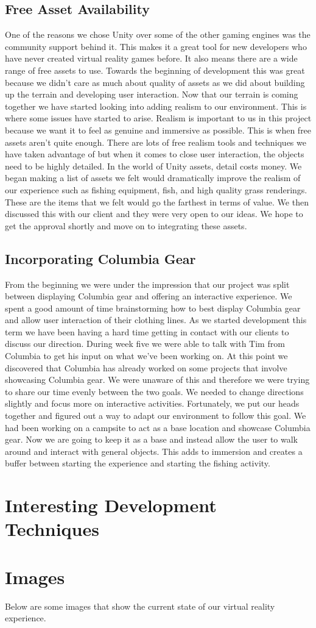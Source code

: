 \documentclass[10pt,journal,compsoc,onecolumn, draftclsnofoot]{IEEEtran}
\begin{document}
\subsection{Free Asset Availability}
One of the reasons we chose Unity over some of the other gaming engines was the community support behind it.
This makes it a great tool for new developers who have never created virtual reality games before.
It also means there are a wide range of free assets to use.
Towards the beginning of development this was great because we didn’t care as much about quality of assets as we did about building up the terrain and developing user interaction.
Now that our terrain is coming together we have started looking into adding realism to our environment.
This is where some issues have started to arise.
Realism is important to us in this project because we want it to feel as genuine and immersive as possible.
This is when free assets aren’t quite enough.
There are lots of free realism tools and techniques we have taken advantage of but when it comes to close user interaction, the objects need to be highly detailed.
In the world of Unity assets, detail costs money. We began making a list of assets we felt would dramatically improve the realism of our experience such as fishing equipment, fish, and high quality grass renderings.
These are the items that we felt would go the farthest in terms of value.
We then discussed this with our client and they were very open to our ideas.
We hope to get the approval shortly and move on to integrating these assets.

\subsection{Incorporating Columbia Gear}
From the beginning we were under the impression that our project was split between displaying Columbia gear and offering an interactive experience.
We spent a good amount of time brainstorming how to best display Columbia gear and allow user interaction of their clothing lines.
As we started development this term we have been having a hard time getting in contact with our clients to discuss our direction.
During week five we were able to talk with Tim from Columbia to get his input on what we've been working on.
At this point we discovered that Columbia has already worked on some projects that involve showcasing Columbia gear.
We were unaware of this and therefore we were trying to share our time evenly between the two goals.
We needed to change directions slightly and focus more on interactive activities.
Fortunately, we put our heads together and figured out a way to adapt our environment to follow this goal.
We had been working on a campsite to act as a base location and showcase Columbia gear.
Now we are going to keep it as a base and instead allow the user to walk around and interact with general objects.
This adds to immersion and creates a buffer between starting the experience and starting the fishing activity.


\section{Interesting Development Techniques}

\section{Images}
Below are some images that show the current state of our virtual reality experience.
\end{document}
